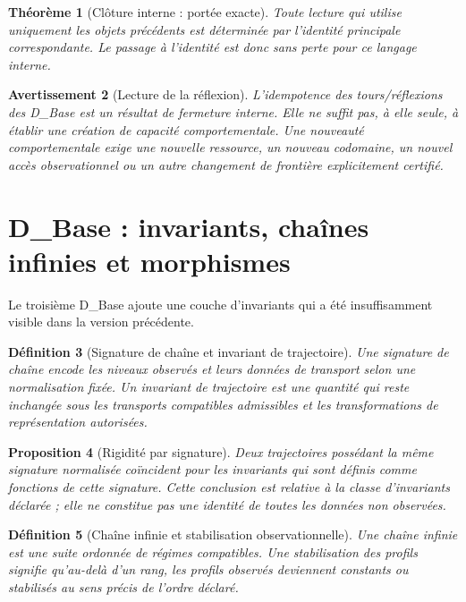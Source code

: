 \documentclass[11pt,a4paper,openany]{book}
\newtheorem{definition}{Définition}[chapter]
\newtheorem{proposition}[definition]{Proposition}
\newtheorem{theorem}[definition]{Théorème}
\newtheorem{warning}[definition]{Avertissement}
\begin{document}
\begin{theorem}[Clôture interne : portée exacte]
Toute lecture qui utilise uniquement les objets précédents est déterminée par l'identité principale correspondante. Le passage à l'identité est donc sans perte pour ce langage interne.
\end{theorem}

\begin{warning}[Lecture de la réflexion]
L'idempotence des tours/réflexions des D\_Base est un résultat de fermeture interne. Elle ne suffit pas, à elle seule, à établir une création de capacité comportementale. Une nouveauté comportementale exige une nouvelle ressource, un nouveau codomaine, un nouvel accès observationnel ou un autre changement de frontière explicitement certifié.
\end{warning}

\section{D\_Base : invariants, chaînes infinies et morphismes}

Le troisième D\_Base ajoute une couche d'invariants qui a été insuffisamment visible dans la version précédente.

\begin{definition}[Signature de chaîne et invariant de trajectoire]
Une signature de chaîne encode les niveaux observés et leurs données de transport selon une normalisation fixée. Un invariant de trajectoire est une quantité qui reste inchangée sous les transports compatibles admissibles et les transformations de représentation autorisées.
\end{definition}

\begin{proposition}[Rigidité par signature]
Deux trajectoires possédant la même signature normalisée coïncident pour les invariants qui sont définis comme fonctions de cette signature. Cette conclusion est relative à la classe d'invariants déclarée ; elle ne constitue pas une identité de toutes les données non observées.
\end{proposition}

\begin{definition}[Chaîne infinie et stabilisation observationnelle]
Une chaîne infinie est une suite ordonnée de régimes compatibles. Une stabilisation des profils signifie qu'au-delà d'un rang, les profils observés deviennent constants ou stabilisés au sens précis de l'ordre déclaré.
\end{definition}
\end{document}
